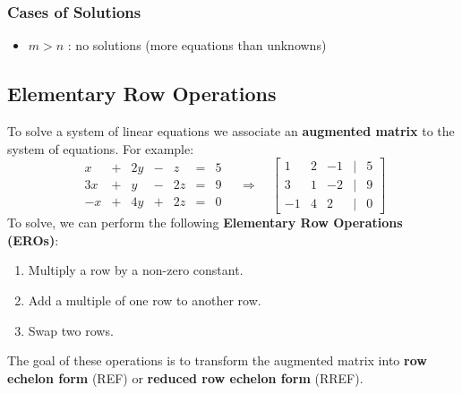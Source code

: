 \documentclass[a4paper, 9pt]{extarticle}
\begin{document}
\subsubsection{Cases of Solutions}
\begin{itemize}
  \item $m > n$ : no solutions (more equations than unknowns) \\

\end{itemize}
\subsection{Elementary Row Operations}
To solve a system of linear equations we associate an \textbf{augmented matrix} to the system of equations. For example:
$$
  \begin{array}
    {ccccccc}x & + & 2y & - & z  & = & 5 \\
    3x         & + & y  & - & 2z & = & 9 \\
    -x         & + & 4y & + & 2z & = & 0
  \end{array}
  \quad \Rightarrow \quad
  \begin{bmatrix}
    1  & 2 & -1 & | & 5 \\
    3  & 1 & -2 & | & 9 \\
    -1 & 4 & 2  & | & 0
  \end{bmatrix}
$$
To solve, we can perform the following \textbf{Elementary Row Operations (EROs)}:
\begin{enumerate}
  \item Multiply a row by a non-zero constant.
  \item Add a multiple of one row to another row.
  \item Swap two rows.
\end{enumerate}
The goal of these operations is to transform the augmented matrix into \textbf{row echelon form} (REF) or \textbf{reduced row echelon form} (RREF).
\end{document}
